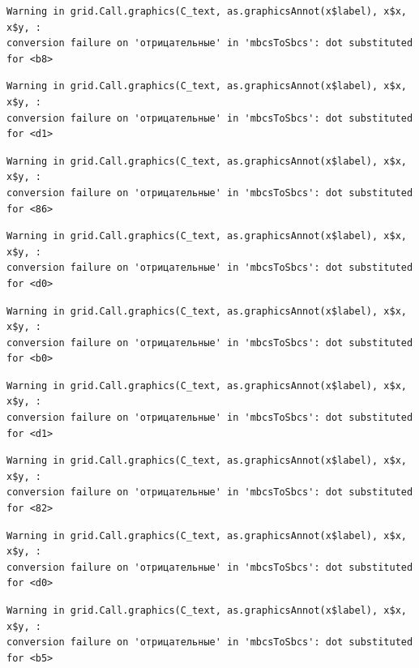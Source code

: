 \documentclass[
  letterpaper,
  DIV=11,
  numbers=noendperiod]{scrreprt}
\theoremstyle{definition}
\theoremstyle{remark}
\begin{document}
\begin{verbatim}
Warning in grid.Call.graphics(C_text, as.graphicsAnnot(x$label), x$x, x$y, :
conversion failure on 'отрицательные' in 'mbcsToSbcs': dot substituted for <b8>
\end{verbatim}

\begin{verbatim}
Warning in grid.Call.graphics(C_text, as.graphicsAnnot(x$label), x$x, x$y, :
conversion failure on 'отрицательные' in 'mbcsToSbcs': dot substituted for <d1>
\end{verbatim}

\begin{verbatim}
Warning in grid.Call.graphics(C_text, as.graphicsAnnot(x$label), x$x, x$y, :
conversion failure on 'отрицательные' in 'mbcsToSbcs': dot substituted for <86>
\end{verbatim}

\begin{verbatim}
Warning in grid.Call.graphics(C_text, as.graphicsAnnot(x$label), x$x, x$y, :
conversion failure on 'отрицательные' in 'mbcsToSbcs': dot substituted for <d0>
\end{verbatim}

\begin{verbatim}
Warning in grid.Call.graphics(C_text, as.graphicsAnnot(x$label), x$x, x$y, :
conversion failure on 'отрицательные' in 'mbcsToSbcs': dot substituted for <b0>
\end{verbatim}

\begin{verbatim}
Warning in grid.Call.graphics(C_text, as.graphicsAnnot(x$label), x$x, x$y, :
conversion failure on 'отрицательные' in 'mbcsToSbcs': dot substituted for <d1>
\end{verbatim}

\begin{verbatim}
Warning in grid.Call.graphics(C_text, as.graphicsAnnot(x$label), x$x, x$y, :
conversion failure on 'отрицательные' in 'mbcsToSbcs': dot substituted for <82>
\end{verbatim}

\begin{verbatim}
Warning in grid.Call.graphics(C_text, as.graphicsAnnot(x$label), x$x, x$y, :
conversion failure on 'отрицательные' in 'mbcsToSbcs': dot substituted for <d0>
\end{verbatim}

\begin{verbatim}
Warning in grid.Call.graphics(C_text, as.graphicsAnnot(x$label), x$x, x$y, :
conversion failure on 'отрицательные' in 'mbcsToSbcs': dot substituted for <b5>
\end{verbatim}
\end{document}
